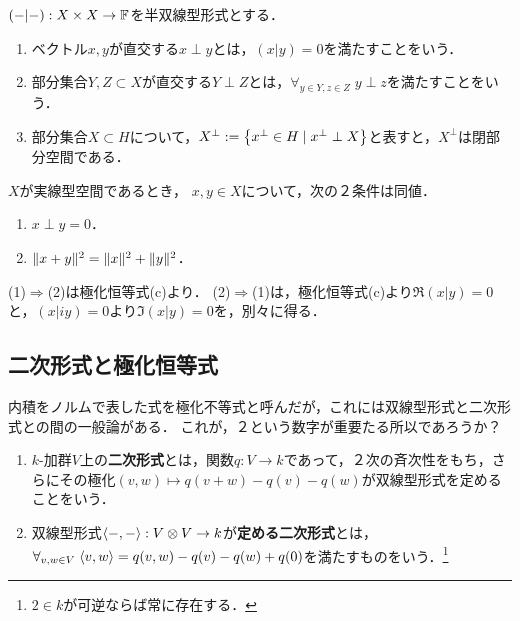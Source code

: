 \documentclass[uplatex,dvipdfmx]{jsreport}
\begin{document}
\begin{definition}[orthogonal]
    $(-|-):X\times X\to\mathbb{F}$を半双線型形式とする．
    \begin{enumerate}
        \item ベクトル$x,y$が直交する$x\perp y$とは，$(x|y)=0$を満たすことをいう．
        \item 部分集合$Y,Z\subset X$が直交する$Y\perp Z$とは，$\forall_{y\in Y,z\in Z}\;y\perp z$を満たすことをいう．
        \item 部分集合$X\subset H$について，$X^\perp:=\left\{x^\perp\in H\mid x^\perp\perp X\right\}$と表すと，$X^\perp$は閉部分空間である．
    \end{enumerate}
\end{definition}

\begin{lemma}\label{lemma-Pythagoras-identity}
    $X$が実線型空間であるとき，
    $x,y\in X$について，次の２条件は同値．
    \begin{enumerate}
        \item $x\perp y=0$．
        \item $\|x+y\|^2=\|x\|^2+\|y\|^2$．
    \end{enumerate}
\end{lemma}
\begin{Proof}
    (1)$\Rightarrow$(2)は極化恒等式(c)より．
    (2)$\Rightarrow$(1)は，極化恒等式(c)より$\Re(x|y)=0$と，$(x|iy)=0$より$\Im(x|y)=0$を，別々に得る．
\end{Proof}

\subsection{二次形式と極化恒等式}

\begin{tcolorbox}[colframe=ForestGreen, colback=ForestGreen!10!white,breakable,colbacktitle=ForestGreen!40!white,coltitle=black,fonttitle=\bfseries\sffamily,
title=]
    内積をノルムで表した式を極化不等式と呼んだが，これには双線型形式と二次形式との間の一般論がある．
    これが，２という数字が重要たる所以であろうか？
\end{tcolorbox}

\begin{definition}\mbox{}
    \begin{enumerate}
        \item $k$-加群$V$上の\textbf{二次形式}とは，関数$q:V\to k$であって，２次の斉次性をもち，さらにその極化$(v,w)\mapsto q(v+w)-q(v)-q(w)$が双線型形式を定めることをいう．
        \item 双線型形式$\langle-,-\rangle:V\otimes V\to k$が\textbf{定める二次形式}とは，$\forall_{v,w\in V}\;\langle v,w\rangle=q(v,w)-q(v)-q(w)+q(0)$を満たすものをいう．\footnote{$2\in k$が可逆ならば常に存在する．}
    \end{enumerate}
\end{definition}
\end{document}
